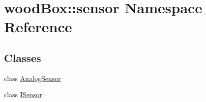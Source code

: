 \hypertarget{namespacewood_box_1_1sensor}{}\section{wood\+Box\+:\+:sensor Namespace Reference}
\label{namespacewood_box_1_1sensor}
\subsection*{Classes}
\begin{DoxyCompactItemize}
\item 
class \mbox{\hyperlink{classwood_box_1_1sensor_1_1_analog_sensor}{Analog\+Sensor}}
\item 
class \mbox{\hyperlink{classwood_box_1_1sensor_1_1_i_sensor}{I\+Sensor}}
\end{DoxyCompactItemize}
